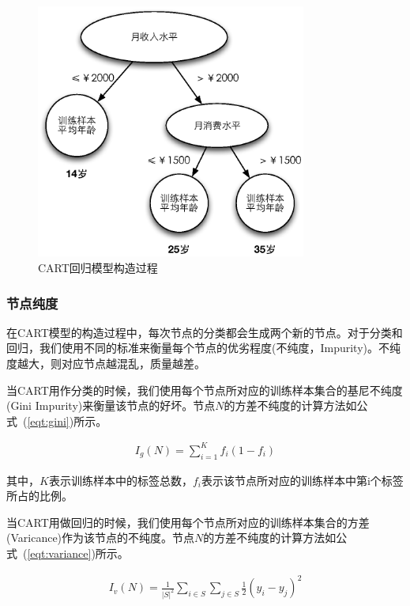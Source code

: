 \documentclass[a4paper,11pt,         %
               ]{article}
\begin{document}
\begin{figure}[htbp]
\centering\includegraphics[width=3.5in]{img/regression_trees.eps}
\caption{CART回归模型构造过程}\label{fig:regression_trees}
\end{figure}

\subsubsection{节点纯度}


在CART模型的构造过程中，每次节点的分类都会生成两个新的节点。对于分类和回归，我们使用不同的标准来衡量每个节点的优劣程度(不纯度，Impurity)。不纯度越大，则对应节点越混乱，质量越差。

当CART用作分类的时候，我们使用每个节点所对应的训练样本集合的基尼不纯度(Gini Impurity)来衡量该节点的好坏。节点$N$的方差不纯度的计算方法如公式~(\ref{eqt:gini})所示。

\begin{eqnarray}
  \label{eqt:gini}
{I}_{g}(N)=\sum_{i=1}^{K}{f_{i}(1 - f_{i})}
\end{eqnarray}

其中，$K$表示训练样本中的标签总数，$f_{i}$表示该节点所对应的训练样本中第i个标签所占的比例。

当CART用做回归的时候，我们使用每个节点所对应的训练样本集合的方差(Varicance)作为该节点的不纯度。节点$N$的方差不纯度的计算方法如公式~(\ref{eqt:variance})所示。

\begin{eqnarray}
  \label{eqt:variance}
{I}_{v}(N)=\frac{1}{{\left|S \right|}^{2}}\sum_{i\in S}\sum_{j\in S}\frac{1}{2}(y_{i}-y_{j})^2
\end{eqnarray}
\end{document}

